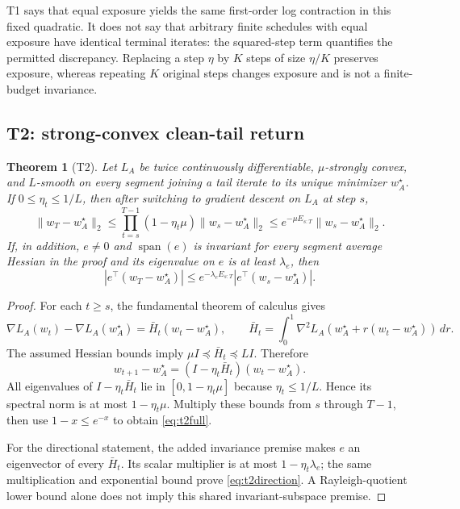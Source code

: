 \documentclass{article}
\newtheorem{theorem}{Theorem}
\begin{document}
T1 says that equal exposure yields the same first-order log contraction in
this fixed quadratic. It does not say that arbitrary finite schedules with
equal exposure have identical terminal iterates: the squared-step term
quantifies the permitted discrepancy. Replacing a step $\eta$ by $K$ steps of
size $\eta/K$ preserves exposure, whereas repeating $K$ original steps changes
exposure and is not a finite-budget invariance.

\subsection{T2: strong-convex clean-tail return}
\label{sec:t2}

\begin{theorem}[T2]
\label{thm:t2}
Let $L_A$ be twice continuously differentiable, $\mu$-strongly convex, and
$L$-smooth on every segment joining a tail iterate to its unique minimizer
$w_A^\star$. If $0\leq\eta_t\leq1/L$, then after switching to gradient
descent on $L_A$ at step $s$,
\begin{equation}
 \lVert w_T-w_A^\star\rVert_2
 \leq\prod_{t=s}^{T-1}(1-\eta_t\mu)
      \lVert w_s-w_A^\star\rVert_2
 \leq e^{-\mu E_{s:T}}\lVert w_s-w_A^\star\rVert_2.
\label{eq:t2full}
\end{equation}
If, in addition, $e\ne0$ and $\operatorname{span}(e)$ is invariant for every segment
average Hessian in the proof and its eigenvalue on $e$ is at least
$\lambda_e$, then
\begin{equation}
 |e^\top(w_T-w_A^\star)|
 \leq e^{-\lambda_eE_{s:T}}|e^\top(w_s-w_A^\star)|.
\label{eq:t2direction}
\end{equation}
\end{theorem}

\begin{proof}
For each $t\geq s$, the fundamental theorem of calculus gives
\[
 \nabla L_A(w_t)-\nabla L_A(w_A^\star)
 =\bar H_t(w_t-w_A^\star),\qquad
 \bar H_t=\int_0^1\nabla^2L_A(w_A^\star+
        r(w_t-w_A^\star))\,dr .
\]
The assumed Hessian bounds imply
$\mu I\preceq\bar H_t\preceq LI$. Therefore
\[
 w_{t+1}-w_A^\star=(I-\eta_t\bar H_t)(w_t-w_A^\star).
\]
All eigenvalues of $I-\eta_t\bar H_t$ lie in
$[0,1-\eta_t\mu]$ because $\eta_t\leq1/L$. Hence its spectral norm is at most
$1-\eta_t\mu$. Multiply these bounds from $s$ through $T-1$, then use
$1-x\leq e^{-x}$ to obtain \eqref{eq:t2full}.

For the directional statement, the added invariance premise makes $e$ an
eigenvector of every $\bar H_t$. Its scalar multiplier is at most
$1-\eta_t\lambda_e$; the same multiplication and exponential bound prove
\eqref{eq:t2direction}. A Rayleigh-quotient lower bound alone does not imply
this shared invariant-subspace premise.
\end{proof}
\end{document}
